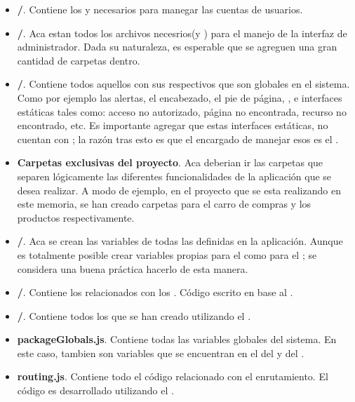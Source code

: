 \begin{itemize}
	\item
		\textbf{\folderAccount/}. Contiene los \templatesMETEOR y \helpersMETEOR necesarios para manegar las cuentas de usuarios. 
	\item
		\textbf{\folderDashboard/}. Aca estan todos los archivos necesrios(\templatesMETEOR y \helpersMETEOR) para el manejo de la interfaz de administrador. Dada su naturaleza, es esperable que se agreguen una gran cantidad de carpetas dentro.
	\item
		\textbf{\folderLayout/}. Contiene todos aquellos \templatesMETEOR con sus respectivos \helpersMETEOR que son globales en el sistema. Como por ejemplo las alertas, el encabezado, el pie de página, \loadingCPT, e interfaces estáticas tales como: acceso no autorizado, página no encontrada, recurso no encontrado, etc. Es importante agregar que estas interfaces estáticas, no cuentan con \helpersMETEOR; la razón tras esto es que el encargado de manejar esos \templatesMETEOR es el \packagesAS \nameRouter.
	\item
		\textbf{Carpetas exclusivas del proyecto}. Aca deberian ir las carpetas que separen lógicamente las diferentes funcionalidades de la aplicación que se desea realizar. A modo de ejemplo, en el proyecto que se esta realizando en este memoria, se han creado carpetas para el carro de compras y los productos respectivamente.
\end{itemize}



\begin{itemize}
	\item
		\textbf{\folderCollections/}. Aca se crean las variables de todas las \collectionsMETEOR definidas en la aplicación. Aunque es totalmente posible crear variables propias para el \clientAS como para el \serverAS; se considera una buena práctica hacerlo de esta manera.
	\item
	 	\textbf{\folderHooks/}. Contiene los \hooksCPT relacionados con los \collectionsMETEOR. Código escrito en base al \packagesAS \nameCollectionHooks.
	\item
		\textbf{\folderSchemas/}. Contiene todos los \schemasDB que se han creado utilizando el \packagesAS \nameCollectionTwo.
	\item
		\textbf{packageGlobals.js}. Contiene todas las variables globales del sistema. En este caso, tambien son variables que se encuentran en el \environmentPL del \clientAS y del \serverAS.
	\item
		\textbf{routing.js}. Contiene todo el código relacionado con el enrutamiento. El código es desarrollado utilizando el \packagesAS \nameRouter.
\end{itemize}

